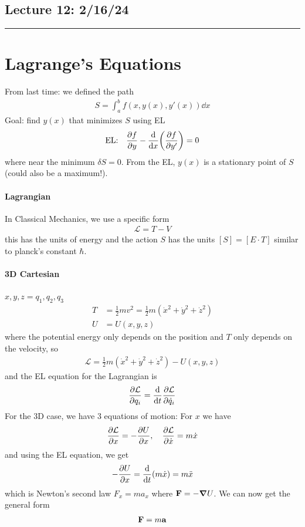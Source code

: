 \documentclass[../main.tex]{subfiles}
\begin{document}
\subsection*{Lecture 12: \hfill  2/16/24}
\hrule \vspace{10px}
\section{Lagrange's Equations}

From last time: we defined the path
\begin{align*}
    S = \int_a^b f(x, y(x), y'(x)) \dd x
\end{align*}
Goal: find $y(x)$ that minimizes $S$ using EL
\begin{align*}
    \text{EL:} \quad \pdv{f}{y} - \dv{x}(\pdv{f}{y'}) = 0
\end{align*}
where near the minimum $\delta S = 0$. From the EL, $y(x)$ is a stationary point of $S$(could also
be a maximum!). 

\paragraph*{Lagrangian} In Classical Mechanics, we use a specific form 
\begin{align*}
    \mathcal{L} = T - V
\end{align*}
this has the units of energy and the action $S$ has the units $[S] = [E \cdot T]$ similar to
planck's constant $\hbar$.
\paragraph*{3D Cartesian} $x, y, z = q_1, q_2, q_3$
\begin{align*}
    T &= \frac{1}{2} m v^2 = \frac{1}{2} m (\dot x^2 + \dot y^2 + \dot z^2) \\
    U &= U(x, y, z)
\end{align*}
where the potential energy only depends on the position and $T$ only depends on the velocity, so 
\begin{align*} 
    \mathcal{L} = \frac{1}{2} m (\dot x^2 + \dot y^2 + \dot z^2) - U(x, y, z)
\end{align*}
and the EL equation for the Lagrangian is
\begin{align*}
    \pdv{\mathcal{L}}{q_i} = \dv{t} \pdv{\mathcal{L}}{\dot q_i}
\end{align*}
For the 3D case, we have 3 equations of motion: For $x$ we have 
\begin{align*}
    \pdv{\mathcal{L}}{x} = - \pdv{U}{x}, \quad \pdv{\mathcal{L}}{\dot x} = m \dot x
\end{align*}
and using the EL equation, we get
\begin{align*}
    -\pdv{U}{x} = \dv{t}(m \dot x) = m \ddot x
\end{align*}
which is Newton's second law $F_x = m a_x$ where $\vb{F} = - \grad U$. We can now get the general form
\begin{align*}
    \vb F = m \vb a
\end{align*}
\end{document}
